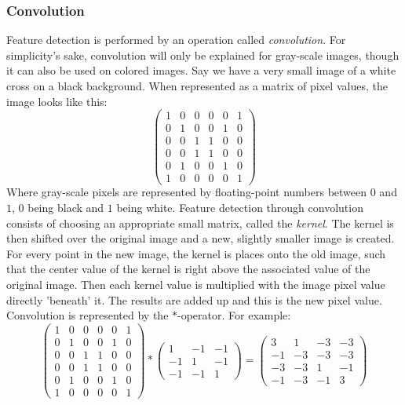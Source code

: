 \documentclass[12pt, titlepage]{article}
\begin{document}
    \subsubsection{Convolution}
    Feature detection is performed by an operation called \textit{convolution}. For simplicity's sake, convolution will only be explained for gray-scale images, though it can also be used on colored images. Say we have a very small image of a white cross on a black background. When represented as a matrix of pixel values, the image looks like this:
    \begin{equation*}
    \begin{pmatrix}
    1 &0 &0 &0 &0 &1\\
    0 &1 &0 &0 &1 &0\\
    0 &0 &1 &1 &0 &0\\
    0 &0 &1 &1 &0 &0\\
    0 &1 &0 &0 &1 &0\\
    1 &0 &0 &0 &0 &1 
    \end{pmatrix}
    \end{equation*}
    Where gray-scale pixels are represented by floating-point numbers between $0$ and $1$, $0$ being black and $1$ being white. Feature detection through convolution consists of choosing an appropriate small matrix, called the \textit{kernel}. The kernel is then shifted over the original image and a new, slightly smaller image is created. For every point in the new image, the kernel is places onto the old image, such that the center value of the kernel is right above the associated value of the original image. Then each kernel value is multiplied with the image pixel value directly 'beneath' it. The results are added up and this is the new pixel value. Convolution is represented by the $*$-operator. For example:
    \begin{equation*}
    \begin{pmatrix}
    1 &0 &0 &0 &0 &1\\
    0 &1 &0 &0 &1 &0\\
    0 &0 &1 &1 &0 &0\\
    0 &0 &1 &1 &0 &0\\
    0 &1 &0 &0 &1 &0\\
    1 &0 &0 &0 &0 &1 
    \end{pmatrix} * \begin{pmatrix}
    1 &-1 &-1\\
    -1 &1 &-1\\
    -1 &-1 &1
    \end{pmatrix} = \begin{pmatrix}
    3 &1 &-3 &-3\\
    -1 & -3 & -3 &-3\\
    -3 &-3 &1 &-1\\
    -1 &-3 &-1 &3
    \end{pmatrix}
    \end{equation*}
\end{document}
